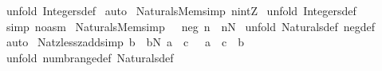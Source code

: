 \begin{isabellebody}
%
\isadelimproof
%
\endisadelimproof
%
\isatagproof
{}\isamarkupfalse%
\ {\isacharparenleft}unfold\ Integers{\isacharunderscore}def{\isacharparenright}\isanewline
{}\isamarkupfalse%
\ auto\isanewline
{}\isamarkupfalse%
%
\endisatagproof
{\isafoldproof}%
%
\isadelimproof
\isanewline
%
\endisadelimproof
\isanewline
{}\isamarkupfalse%
\ Naturals{\isacharunderscore}{}{\isacharunderscore}Mem{\isacharbrackleft}simp{\isacharbrackright}{\isacharcolon}\ {\isachardoublequoteopen}{\isacharparenleft}{\isacharparenleft}n{\isacharcolon}{\isacharcolon}int{\isacharparenright}{\isacharcolon}{\isacharpercent}Z{\isacharparenright}{\isachardoublequoteclose}\isanewline
%
\isadelimproof
%
\endisadelimproof
%
\isatagproof
{}\isamarkupfalse%
\ {\isacharparenleft}unfold\ Integers{\isacharunderscore}def{\isacharparenright}\isanewline
{}\isamarkupfalse%
\ {\isacharparenleft}simp\ {\isacharparenleft}no{\isacharunderscore}asm{\isacharparenright}{\isacharparenright}\isanewline
{}\isamarkupfalse%
%
\endisatagproof
{\isafoldproof}%
%
\isadelimproof
\isanewline
%
\endisadelimproof
\isanewline
{}\isamarkupfalse%
\ Naturals{\isacharunderscore}Mem{\isacharbrackleft}simp{\isacharbrackright}{\isacharcolon}\ {\isachardoublequoteopen}\ {\isachartilde}\ neg\ n\ {\isacharminus}{\isacharminus}{\isachargreater}\ n{\isacharcolon}{\isacharpercent}N{\isachardoublequoteclose}\isanewline
%
\isadelimproof
%
\endisadelimproof
%
\isatagproof
{}\isamarkupfalse%
\ {\isacharparenleft}unfold\ Naturals{\isacharunderscore}def\ neg{\isacharunderscore}def{\isacharparenright}\isanewline
{}\isamarkupfalse%
\ auto\isanewline
{}\isamarkupfalse%
%
\endisatagproof
{\isafoldproof}%
%
\isadelimproof
\isanewline
%
\endisadelimproof
\isanewline
\isanewline
{}\isamarkupfalse%
\ Nat{\isacharunderscore}zless{\isacharunderscore}zadd{\isacharbrackleft}simp{\isacharbrackright}{\isacharcolon}\ {\isachardoublequoteopen}{\isacharbang}{\isacharbang}b{\isachardot}\ {\isacharbrackleft}{\isacharbar}\ b{\isacharcolon}{\isacharpercent}N{\isacharsemicolon}\ a\ {\isacharless}\ c\ {\isacharbar}{\isacharbrackright}\ {\isacharequal}{\isacharequal}{\isachargreater}\ {\isacharparenleft}a\ {\isacharless}\ c\ {\isacharplus}\ b{\isacharparenright}{\isachardoublequoteclose}\isanewline
%
\isadelimproof
%
\endisadelimproof
%
\isatagproof
{}\isamarkupfalse%
\ {\isacharparenleft}unfold\ numb{\isacharunderscore}range{\isacharunderscore}def\ Naturals{\isacharunderscore}def{\isacharparenright}\isanewline

\end{isabellebody}
